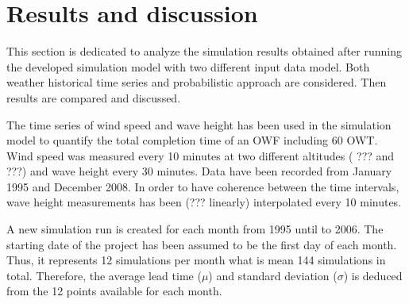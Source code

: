 \section{Results and discussion}
This section is dedicated to analyze the simulation results obtained after running the developed simulation model with two different input data model. Both weather historical time series and probabilistic approach are considered. Then results are compared and discussed.

The time series of wind speed and wave height has been used in the simulation model to quantify the total completion time of an OWF including 60 OWT. Wind speed was measured every 10 minutes at two different altitudes ( ??? and ???) and wave height every 30 minutes. Data have been recorded from January 1995 and December 2008. In order to have coherence between the time intervals, wave height measurements has been (??? linearly) interpolated every 10 minutes.

A new simulation run is created for each month from 1995 until to 2006. The starting date of the project has been assumed to be the first day of each month. Thus, it represents 12 simulations per month what is mean 144 simulations in total. Therefore, the average lead time ($\mu$) and standard deviation ($\sigma$) is deduced from the 12 points available for each month.